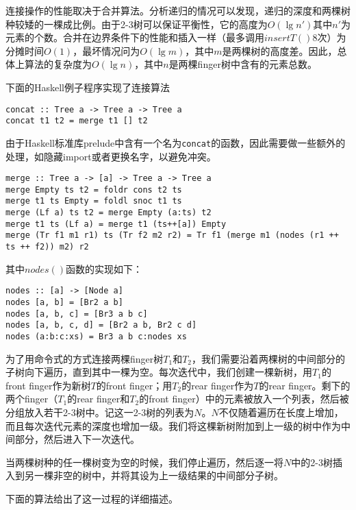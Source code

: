 \documentclass[UTF8]{article}
\begin{document}
连接操作的性能取决于合并算法。分析递归的情况可以发现，递归的深度和两棵树种较矮的一棵成比例。由于2-3树可以保证平衡性，它的高度为$O(\lg n')$其中$n'$为元素的个数。合并在边界条件下的性能和插入一样（最多调用$insertT()$8次）为分摊时间$O(1)$，最坏情况问为$O(\lg m)$，其中$m$是两棵树的高度差。因此，总体上算法的复杂度为$O(\lg n)$，其中$n$是两棵finger树中含有的元素总数。

下面的Haskell例子程序实现了连接算法

\lstset{language=Haskell}
\begin{lstlisting}
concat :: Tree a -> Tree a -> Tree a
concat t1 t2 = merge t1 [] t2
\end{lstlisting}

由于Haskell标准库prelude中含有一个名为\texttt{concat}的函数，因此需要做一些额外的处理，如隐藏import或者更换名字，以避免冲突。

\begin{lstlisting}
merge :: Tree a -> [a] -> Tree a -> Tree a
merge Empty ts t2 = foldr cons t2 ts
merge t1 ts Empty = foldl snoc t1 ts
merge (Lf a) ts t2 = merge Empty (a:ts) t2
merge t1 ts (Lf a) = merge t1 (ts++[a]) Empty
merge (Tr f1 m1 r1) ts (Tr f2 m2 r2) = Tr f1 (merge m1 (nodes (r1 ++ ts ++ f2)) m2) r2
\end{lstlisting}

其中$nodes()$函数的实现如下：

\begin{lstlisting}
nodes :: [a] -> [Node a]
nodes [a, b] = [Br2 a b]
nodes [a, b, c] = [Br3 a b c]
nodes [a, b, c, d] = [Br2 a b, Br2 c d]
nodes (a:b:c:xs) = Br3 a b c:nodes xs
\end{lstlisting}

为了用命令式的方式连接两棵finger树$T_1$和$T_2$，我们需要沿着两棵树的中间部分的子树向下遍历，直到其中一棵为空。每次迭代中，我们创建一棵新树，用$T_1$的front finger作为新树$T$的front finger；用$T_2$的rear finger作为$T$的rear finger。剩下的两个finger（$T_1$的rear finger和$T_2$的front finger）中的元素被放入一个列表，然后被分组放入若干2-3树中。记这一2-3树的列表为$N$。$N$不仅随着遍历在长度上增加，而且每次迭代元素的深度也增加一级。我们将这棵新树附加到上一级的树中作为中间部分，然后进入下一次迭代。

当两棵树种的任一棵树变为空的时候，我们停止遍历，然后逐一将$N$中的2-3树插入到另一棵非空的树中，并将其设为上一级结果的中间部分子树。

下面的算法给出了这一过程的详细描述。
\end{document}
